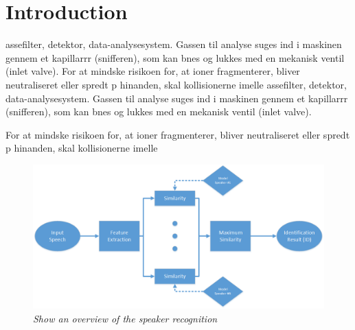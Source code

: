 \section*{Introduction}
assefilter, detektor, data-analysesystem. 
Gassen til analyse suges ind i maskinen gennem et kapillarrr (snifferen), som kan bnes og lukkes med en mekanisk ventil (inlet valve). 
For at mindske risikoen for, at ioner fragmenterer, bliver neutraliseret eller spredt p hinanden, skal kollisionerne imelle
assefilter, detektor, data-analysesystem. 
Gassen til analyse suges ind i maskinen gennem et kapillarrr (snifferen), som kan bnes og lukkes med en mekanisk ventil (inlet valve). 
 
For at mindske risikoen for, at ioner fragmenterer, bliver neutraliseret eller spredt p hinanden, skal kollisionerne imelle \cite{RefWorks:22}

\begin{figure} 
	\includegraphics[width=\columnwidth]{Figures/Overview_speech_01.png}
	\caption{\textit{Show an overview of the speaker recognition}}
	\label{fig:Overview}
\end{figure}
